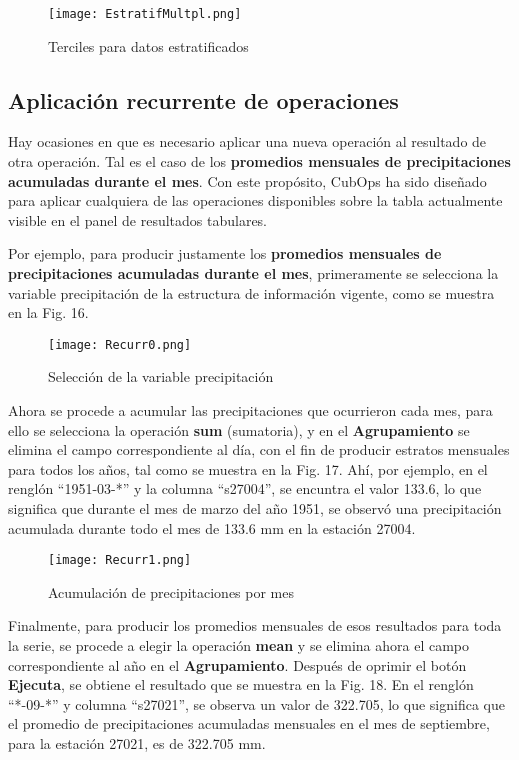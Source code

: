 \documentclass[spanish,]{article}
\begin{document}
\begin{figure}
\centering
\texttt{[image: EstratifMultpl.png]}
\caption{Terciles para datos estratificados}
\end{figure}

\subsection{Aplicación recurrente de
operaciones}\label{aplicacion-recurrente-de-operaciones}

Hay ocasiones en que es necesario aplicar una nueva operación al
resultado de otra operación. Tal es el caso de los \textbf{promedios
mensuales de precipitaciones acumuladas durante el mes}. Con este
propósito, CubOps ha sido diseñado para aplicar cualquiera de las
operaciones disponibles sobre la tabla actualmente visible en el panel
de resultados tabulares.

Por ejemplo, para producir justamente los \textbf{promedios mensuales de
precipitaciones acumuladas durante el mes}, primeramente se selecciona
la variable precipitación de la estructura de información vigente, como
se muestra en la Fig. 16.

\begin{figure}
\centering
\texttt{[image: Recurr0.png]}
\caption{Selección de la variable precipitación}
\end{figure}

Ahora se procede a acumular las precipitaciones que ocurrieron cada mes,
para ello se selecciona la operación \textbf{sum} (sumatoria), y en el
\textbf{Agrupamiento} se elimina el campo correspondiente al día, con el
fin de producir estratos mensuales para todos los años, tal como se
muestra en la Fig. 17. Ahí, por ejemplo, en el renglón ``1951-03-*'' y
la columna ``s27004'', se encuntra el valor 133.6, lo que significa que
durante el mes de marzo del año 1951, se observó una precipitación
acumulada durante todo el mes de 133.6 mm en la estación 27004.

\begin{figure}
\centering
\texttt{[image: Recurr1.png]}
\caption{Acumulación de precipitaciones por mes}
\end{figure}

Finalmente, para producir los promedios mensuales de esos resultados
para toda la serie, se procede a elegir la operación \textbf{mean} y se
elimina ahora el campo correspondiente al año en el
\textbf{Agrupamiento}. Después de oprimir el botón \textbf{Ejecuta}, se
obtiene el resultado que se muestra en la Fig. 18. En el renglón
``*-09-*'' y columna ``s27021'', se observa un valor de 322.705, lo que
significa que el promedio de precipitaciones acumuladas mensuales en el
mes de septiembre, para la estación 27021, es de 322.705 mm.
\end{document}
